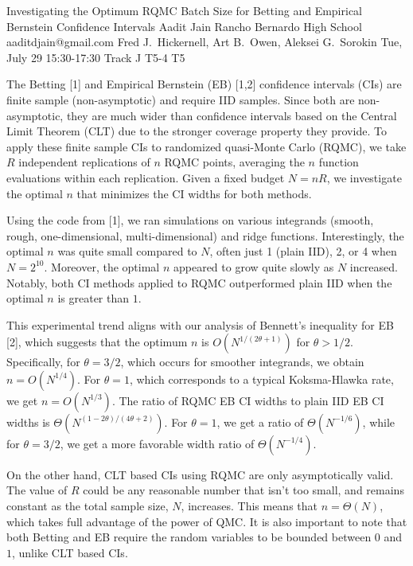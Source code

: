\begin{talk}
  {Investigating the Optimum RQMC Batch Size for Betting and Empirical Bernstein Confidence Intervals}%
  {Aadit Jain}%
  {Rancho Bernardo High School}%
  {aaditdjain@gmail.com}%
  {Fred J.\ Hickernell, Art B.\ Owen, Aleksei G.\ Sorokin}%
  {}%
  {Tue, July 29 15:30-17:30 Track J}%
  {T5-4}%
  {T5}%
			

The Betting [1] and Empirical Bernstein (EB) [1,2] confidence intervals (CIs) are finite sample (non-asymptotic) and require IID samples. Since both are non-asymptotic, they are much wider than confidence intervals based on the Central Limit Theorem (CLT) due to the stronger coverage property they provide. To apply these finite sample CIs to randomized quasi-Monte Carlo (RQMC), we take $R$ independent replications of $n$ RQMC points, averaging the $n$ function evaluations within each replication. Given a fixed budget $N = nR$, we investigate the optimal $n$ that minimizes the CI widths for both methods.  

Using the code from [1], we ran simulations on various integrands (smooth, rough, one-dimensional, multi-dimensional) and ridge functions. Interestingly, the optimal $n$ was quite small compared to $N$, often just 1 (plain IID), 2, or 4 when $N = 2^{10}$. Moreover, the optimal $n$ appeared to grow quite slowly as $N$ increased. Notably, both CI methods applied to RQMC outperformed plain IID when the optimal $n$ is greater than $1$.  

This experimental trend aligns with our analysis of Bennett’s inequality for EB [2], which suggests that the optimum $n$ is $O(N^{1/(2\theta + 1)})$ for $\theta > 1/2$. 
Specifically, for $\theta = 3/2$, which occurs for smoother integrands, we obtain $n = O(N^{1/4})$. For $\theta = 1$, which corresponds to a typical Koksma-Hlawka rate, we get $n = O(N^{1/3})$. The ratio of RQMC EB CI widths to plain IID EB CI widths is $\Theta( N^{(1-2\theta)/(4\theta+2)})$. For $\theta=1$,
we get a ratio of $\Theta(N^{-1/6})$,
while for $\theta=3/2$,
we get a more favorable width ratio of $\Theta(N^{-1/4})$. 


On the other hand, CLT based CIs using RQMC  are only asymptotically valid. The value of $R$ could be any reasonable number that isn't too small, and remains constant as the total sample size, $N$, increases.  This means that $n = \Theta(N)$, which takes full advantage of the power of QMC.  It is also important to note that both Betting and EB require the random variables to be bounded between $0$ and $1$, unlike CLT based CIs. 



\end{talk}
